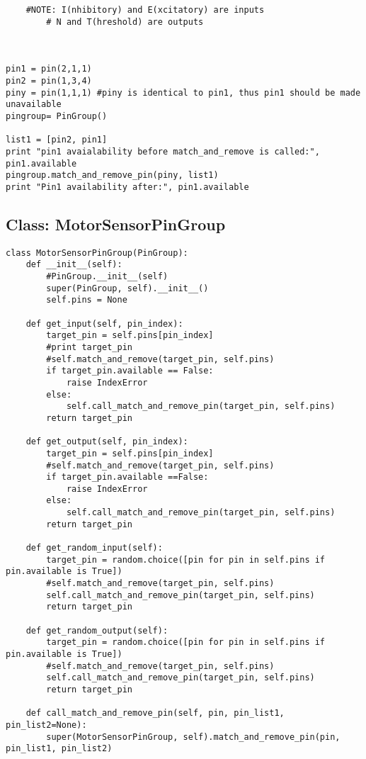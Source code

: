 \documentclass[a4paper]{article}
\begin{document}
\begin{enumerate}
\begin{verbatim}
    #NOTE: I(nhibitory) and E(xcitatory) are inputs
        # N and T(hreshold) are outputs



pin1 = pin(2,1,1)
pin2 = pin(1,3,4)
piny = pin(1,1,1) #piny is identical to pin1, thus pin1 should be made unavailable
pingroup= PinGroup()

list1 = [pin2, pin1]
print "pin1 avaialability before match_and_remove is called:", pin1.available 
pingroup.match_and_remove_pin(piny, list1)
print "Pin1 availability after:", pin1.available
\end{verbatim}
\end{enumerate}

\subsection{Class: MotorSensorPinGroup}
\label{sec-4-4}
\begin{verbatim}
class MotorSensorPinGroup(PinGroup):
    def __init__(self):
        #PinGroup.__init__(self)
        super(PinGroup, self).__init__()
        self.pins = None

    def get_input(self, pin_index):
        target_pin = self.pins[pin_index]
        #print target_pin
        #self.match_and_remove(target_pin, self.pins)
        if target_pin.available == False:
            raise IndexError
        else:
            self.call_match_and_remove_pin(target_pin, self.pins)
        return target_pin

    def get_output(self, pin_index):
        target_pin = self.pins[pin_index]
        #self.match_and_remove(target_pin, self.pins)
        if target_pin.available ==False:
            raise IndexError
        else:
            self.call_match_and_remove_pin(target_pin, self.pins)
        return target_pin

    def get_random_input(self):
        target_pin = random.choice([pin for pin in self.pins if pin.available is True])
        #self.match_and_remove(target_pin, self.pins)
        self.call_match_and_remove_pin(target_pin, self.pins)
        return target_pin

    def get_random_output(self):
        target_pin = random.choice([pin for pin in self.pins if pin.available is True])
        #self.match_and_remove(target_pin, self.pins)
        self.call_match_and_remove_pin(target_pin, self.pins)
        return target_pin

    def call_match_and_remove_pin(self, pin, pin_list1, pin_list2=None):
        super(MotorSensorPinGroup, self).match_and_remove_pin(pin, pin_list1, pin_list2)
\end{verbatim}
\end{document}
